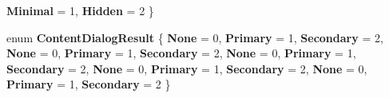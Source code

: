 \begin{DoxyCompactItemize}
{\bfseries Minimal} = 1, 
{\bfseries Hidden} = 2
 \}
\item 
\mbox{\label{namespace_windows_1_1_u_i_1_1_xaml_1_1_controls_aeb84959a5f71279742b9e779903775a6}} 
enum {\bfseries Content\+Dialog\+Result} \{ \newline
{\bfseries None} = 0, 
{\bfseries Primary} = 1, 
{\bfseries Secondary} = 2, 
{\bfseries None} = 0, 
\newline
{\bfseries Primary} = 1, 
{\bfseries Secondary} = 2, 
{\bfseries None} = 0, 
{\bfseries Primary} = 1, 
\newline
{\bfseries Secondary} = 2, 
{\bfseries None} = 0, 
{\bfseries Primary} = 1, 
{\bfseries Secondary} = 2, 
\newline
{\bfseries None} = 0, 
{\bfseries Primary} = 1, 
{\bfseries Secondary} = 2
 \}
\end{DoxyCompactItemize}
